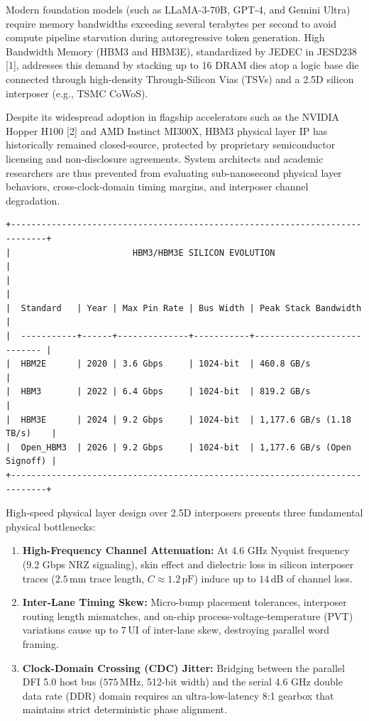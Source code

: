 \documentclass[journal,10pt,twocolumn]{IEEEtran}
\begin{document}
Modern foundation models (such as LLaMA-3-70B, GPT-4, and Gemini Ultra) require memory bandwidths exceeding several terabytes per second to avoid compute pipeline starvation during autoregressive token generation. High Bandwidth Memory (HBM3 and HBM3E), standardized by JEDEC in JESD238 [1], addresses this demand by stacking up to 16 DRAM dies atop a logic base die connected through high-density Through-Silicon Vias (TSVs) and a 2.5D silicon interposer (e.g., TSMC CoWoS).

Despite its widespread adoption in flagship accelerators such as the NVIDIA Hopper H100 [2] and AMD Instinct MI300X, HBM3 physical layer IP has historically remained closed-source, protected by proprietary semiconductor licensing and non-disclosure agreements. System architects and academic researchers are thus prevented from evaluating sub-nanosecond physical layer behaviors, cross-clock-domain timing margins, and interposer channel degradation.

\begin{footnotesize}\begin{verbatim}
+-----------------------------------------------------------------------------+
|                        HBM3/HBM3E SILICON EVOLUTION                         |
|                                                                             |
|  Standard   | Year | Max Pin Rate | Bus Width | Peak Stack Bandwidth       |
|  -----------+------+--------------+-----------+---------------------------- |
|  HBM2E      | 2020 | 3.6 Gbps     | 1024-bit  | 460.8 GB/s                  |
|  HBM3       | 2022 | 6.4 Gbps     | 1024-bit  | 819.2 GB/s                  |
|  HBM3E      | 2024 | 9.2 Gbps     | 1024-bit  | 1,177.6 GB/s (1.18 TB/s)    |
|  Open_HBM3  | 2026 | 9.2 Gbps     | 1024-bit  | 1,177.6 GB/s (Open Signoff) |
+-----------------------------------------------------------------------------+
\end{verbatim}\end{footnotesize}

High-speed physical layer design over 2.5D interposers presents three fundamental physical bottlenecks:
\begin{enumerate}
  \item \textbf{High-Frequency Channel Attenuation:} At 4.6 GHz Nyquist frequency (9.2 Gbps NRZ signaling), skin effect and dielectric loss in silicon interposer traces ($2.5\,\text{mm}$ trace length, $C \approx 1.2\,\text{pF}$) induce up to $14\,\text{dB}$ of channel loss.
  \item \textbf{Inter-Lane Timing Skew:} Micro-bump placement tolerances, interposer routing length mismatches, and on-chip process-voltage-temperature (PVT) variations cause up to $7\,\text{UI}$ of inter-lane skew, destroying parallel word framing.
  \item \textbf{Clock-Domain Crossing (CDC) Jitter:} Bridging between the parallel DFI 5.0 host bus ($575\,\text{MHz}$, 512-bit width) and the serial 4.6 GHz double data rate (DDR) domain requires an ultra-low-latency 8:1 gearbox that maintains strict deterministic phase alignment.
\end{enumerate}
\end{document}
